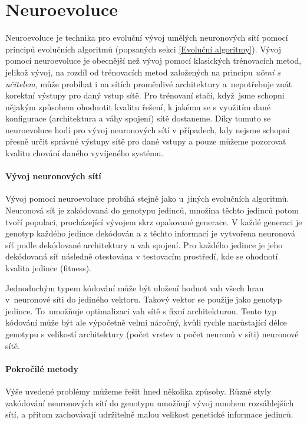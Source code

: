 \section{Neuroevoluce} \label{NN - evolve}
Neuroevoluce \citet{Lehman:2013} je technika pro evoluční vývoj umělých
neuronových sítí pomocí principů evolučních algoritmů (popsaných sekci
\ref{Evoluční algoritmy}). Vývoj pomocí neuroevoluce je obecnější než vývoj
pomocí klasických trénovacích metod, jelikož vývoj, na rozdíl od trénovacích
metod založených na principu \emph{učení s učitelem}, může probíhat i na sítích
proměnlivé architektury a~nepotřebuje znát korektní výstupy pro daný vstup
sítě. Pro trénovaní stačí, když~jsme schopni nějakým způsobem ohodnotit kvalitu
řešení, k jakému se s využitím dané konfigurace (architektura a váhy spojení)
sítě dostaneme. Díky tomuto se neuroevoluce hodí pro vývoj neuronových sítí v
případech, kdy nejsme schopni přesně určit správné výstupy sítě pro dané vstupy
a pouze můžeme pozorovat kvalitu chování daného vyvíjeného systému.

\paragraph{Vývoj neuronových sítí}
Vývoj pomocí neuroevoluce probíhá stejně jako u~jiných evolučních algoritmů.
Neuronová síť je zakódovaná do genotypu jedinců, množina těchto jedinců potom
tvoří populaci, procházející vývojem skrz opakované generace. V každé generaci
je genotyp každého jedince dekódován a z těchto informací je vytvořena
neuronová síť podle dekódované architektury a vah spojení. Pro každého jedince
je jeho dekódovaná síť následně otestována v testovacím prostředí, kde se
ohodnotí kvalita jedince (fitness).

Jednoduchým typem kódování může být uložení hodnot vah všech hran v~neuronové
síti do jediného vektoru. Takový vektor se použije jako genotyp jedince.
To~umožňuje optimalizaci vah sítě s fixní architekturou. Tento typ kódování
může být ale výpočetně velmi náročný, kvůli rychle narůstající délce genotypu s
velikostí architektury (počet vrstev a počet neuronů v síti) neuronové sítě.

\paragraph{Pokročilé metody}
Výše uvedené problémy můžeme řešit hned několika způsoby. Různé styly
zakódování neuronových sítí do genotypu umožňují vývoj mnohem
rozsáhlejších sítí, a přitom zachovávají udržitelně malou velikost genetické
informace jedinců. 

